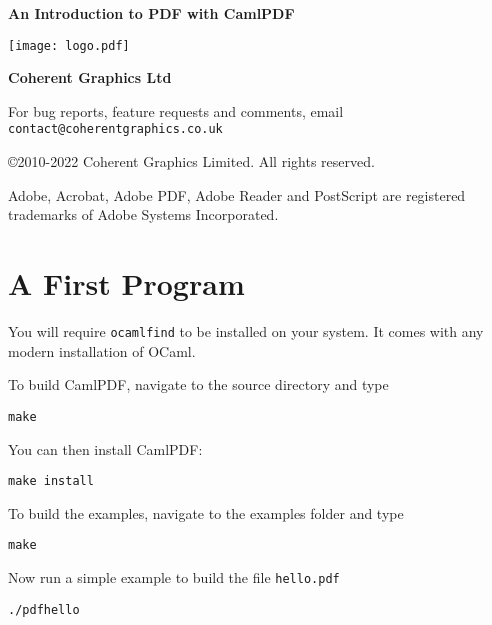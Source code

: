 \documentclass[a4paper]{memoir}
\newcommand{\smallgap}{\vspace{4mm}}
\begin{document}
\frontmatter
\thispagestyle{empty}

\begin{flushright}

{\sffamily \bfseries \Huge An Introduction to PDF with CamlPDF}


\vfill

\texttt{[image: logo.pdf]}

\vspace{2mm}
{\sffamily \bfseries \LARGE Coherent Graphics Ltd}

\end{flushright}

\clearpage

\thispagestyle{empty}
\noindent For bug reports, feature requests and comments, email\\ \texttt{contact@coherentgraphics.co.uk}

\vspace*{\fill}
\noindent\copyright 2010-2022 Coherent Graphics Limited. All rights reserved.

\smallgap 
\noindent Adobe, Acrobat, Adobe PDF, Adobe Reader and PostScript are
registered trademarks of Adobe Systems Incorporated.

\cleardoublepage

\mainmatter

\pagestyle{ruled}
\section*{A First Program}
You will require \texttt{ocamlfind} to be installed on your system. It comes with any modern installation of OCaml.

To build \textsf{CamlPDF}, navigate to the source directory and type
\begin{framed}
\verb!make!
\end{framed}

\noindent You can then install \textsf{CamlPDF}:
\begin{framed}
\verb!make install!
\end{framed}


\noindent To build the examples, navigate to the examples folder and type
\begin{framed}
\verb!make!
\end{framed}
\noindent Now run a simple example to build the file \verb!hello.pdf!
\begin{framed}
\verb!./pdfhello!
\end{framed}
\end{document}
